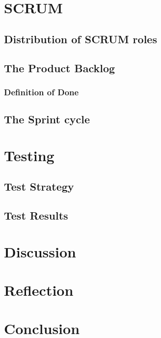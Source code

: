 \documentclass[a4paper,11pt]{article}
\begin{document}
\pagebreak
\section{SCRUM}


\subsection{Distribution of SCRUM roles}


\subsection{The Product Backlog}


\subsubsection{Definition of Done}


\subsection{The Sprint cycle}


\pagebreak
\section{Testing}


\subsection{Test Strategy}


\subsection{Test Results}


\pagebreak
\section{Discussion}


\pagebreak
\section{Reflection}


\pagebreak
\section{Conclusion}


\pagebreak


\pagebreak
\appendix
\end{document}
